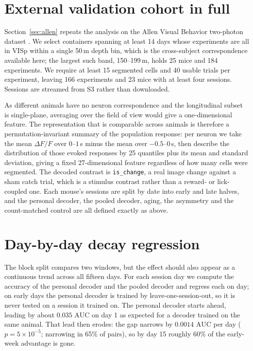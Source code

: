 \documentclass[mlmain,onecolumn]{jmlr}
\newcommand{\auc}{\mathrm{AUC}}
\begin{document}
\section{External validation cohort in full}
\label{app:allen}
Section~\ref{sec:allen} repeats the analysis on the Allen
Visual Behavior two-photon dataset \citep{allenvb2023}. We select containers spanning at least 14
days whose experiments are all in VISp within a single 50\,\textmu m depth bin, which is the
cross-subject correspondence available here; the largest such band, 150--199\,\textmu m, holds 25
mice and 184 experiments. We require at least 15 segmented cells and 40 usable trials per
experiment, leaving 166 experiments and 23 mice with at least four sessions. Sessions are streamed
from S3 rather than downloaded.

As different animals have no neuron correspondence and the longitudinal subset is single-plane,
averaging over the field of view would give a one-dimensional feature. The representation that is
comparable across animals is
therefore a permutation-invariant summary of the population response: per neuron we take the mean
$\Delta F/F$ over $0$--$1$\,s minus the mean over $-0.5$--$0$\,s, then describe the distribution of
those evoked responses by 25 quantiles plus its mean and standard deviation, giving a fixed
27-dimensional feature regardless of how many cells were segmented. The decoded contrast is
\texttt{is\_change}, a real image change against a sham catch trial, which is a stimulus contrast
rather than a reward- or lick-coupled one. Each mouse's sessions are split by date into early and
late halves, and the personal decoder, the pooled decoder, aging, the asymmetry and the
count-matched control are all defined exactly as above.


\section{Day-by-day decay regression}
\label{app:decay}
The block split compares two windows, but the effect should also appear as a continuous trend across
all fifteen days. For each session day we compute the accuracy of the personal decoder and the pooled
decoder and regress each on day; on early days the personal decoder is trained by
leave-one-session-out, so it is never tested on a session it trained on. The personal decoder starts
ahead, leading by about $0.035$ $\auc$ on day 1 as expected for a decoder trained on the same animal.
That lead then erodes: the gap narrows by $0.0014$ $\auc$ per day ($p = 5 \times 10^{-5}$; narrowing
in 65\% of pairs), so by day 15 roughly 60\% of the early-week advantage is gone.
\end{document}
